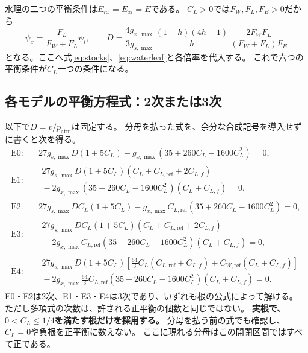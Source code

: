 \documentclass[a4paper,11pt]{ltjsarticle}
\begin{document}
水理の二つの平衡条件は$E_{rx}=E_{xl}=E$である。
$C_L>0$では$F_W,F_L,F_E>0$だから
\begin{equation}\label{eq:hydsolve}
 \psi_x=\frac{F_L}{F_W+F_L}\psi_l,\qquad
 D=\frac{4g_{x,\max}}{3g_{s,\max}}
       \frac{(1-h)(4h-1)}h\,
       \frac{2F_WF_L}{(F_W+F_L)F_E}
\end{equation}
となる。ここへ式\eqref{eq:stocks}、\eqref{eq:waterleaf}と各倍率を代入する。
これで六つの平衡条件が$C_L$一つの条件になる。

\subsection{各モデルの平衡方程式：2次または3次}
以下で$D=v/p_{\mathrm{atm}}$は固定する。
分母を払った式を、余分な合成記号を導入せずに書くと次を得る。
\begin{align}
\text{E0:}\quad&
 27g_{s,\max}D(1+5C_L)
 -g_{x,\max}(35+260C_L-1600C_L^2)=0, \label{eq:e0}\\
\text{E1:}\quad&
\begin{aligned}
 27g_{s,\max}D(1+5C_L)(C_L+C_{L,\mathrm{ref}}+2C_{L,f})\\
 {}-2g_{x,\max}(35+260C_L-1600C_L^2)(C_L+C_{L,f})=0,
\end{aligned}\label{eq:e1}\\
\text{E2:}\quad&
 27g_{s,\max}DC_L(1+5C_L)
 -g_{x,\max}C_{L,\mathrm{ref}}(35+260C_L-1600C_L^2)=0,\label{eq:e2}\\
\text{E3:}\quad&
\begin{aligned}
 27g_{s,\max}DC_L(1+5C_L)(C_L+C_{L,\mathrm{ref}}+2C_{L,f})\\
 {}-2g_{x,\max}C_{L,\mathrm{ref}}(35+260C_L-1600C_L^2)(C_L+C_{L,f})=0,
\end{aligned}\label{eq:e3}\\
\text{E4:}\quad&
\begin{aligned}
 27g_{s,\max}D(1+5C_L)
 \left[\frac{64}{3}C_L(C_{L,\mathrm{ref}}+C_{L,f})
             +C_{W,\mathrm{ref}}(C_L+C_{L,f})\right]\\
 {}-2g_{x,\max}\frac{64}{3}C_{L,\mathrm{ref}}
             (35+260C_L-1600C_L^2)(C_L+C_{L,f})=0 .
\end{aligned}\label{eq:e4}
\end{align}
E0・E2は2次、E1・E3・E4は3次であり、いずれも根の公式によって解ける。
ただし多項式の次数は、許される正平衡の個数と同じではない。
\textbf{実根で、$0<C_L\leq1/4$を満たす根だけを採用する。}
分母を払う前の式でも確認し、$C_L=0$や負根を正平衡に数えない。
ここに現れる分母はこの開閉区間ではすべて正である。
\end{document}

